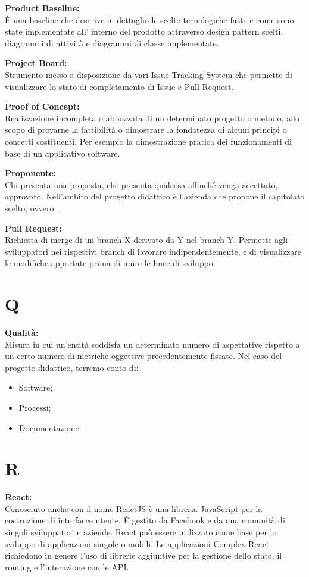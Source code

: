 \documentclass[a4paper, oneside, openany, dvipsnames, table]{article}
\begin{document}
\textbf{Product Baseline:}\\	\`E una baseline che descrive in dettaglio le scelte tecnologiche fatte e come sono state implementate all' interno del prodotto attraverso design pattern scelti, diagrammi di attività e diagrammi di classe implementate.

\textbf{Project Board:}\\	Strumento messo a disposizione da vari Issue Tracking System che permette di visualizzare lo stato di completamento di Issue e Pull Request.

\textbf{Proof of Concept:}\\	Realizzazione incompleta o abbozzata di un determinato progetto o metodo, allo scopo di provarne la fattibilità o dimostrare la fondatezza di alcuni principi o concetti costituenti. Per esempio la dimostrazione pratica dei funzionamenti di base di un applicativo software.

\textbf{Proponente:}\\	Chi presenta una proposta, che presenta qualcosa affinché venga accettato, approvato. Nell'ambito del progetto didattico è l'azienda che propone il capitolato scelto, ovvero \proponente.

\textbf{Pull Request:}\\	Richiesta di merge di un branch X derivato da Y nel branch Y. Permette agli sviluppatori nei rispettivi branch di lavorare indipendentemente, e di visualizzare le modifiche apportate prima di unire le linee di sviluppo.

\newpage
\section{Q}
\textbf{Qualità:}\\	Misura in cui un'entità soddisfa un determinato numero di aspettative rispetto a un certo numero di metriche oggettive precedentemente fissate. Nel caso del progetto didattico, terremo conto di:
\begin{itemize}
	\item Software;
	\item Processi;
	\item Documentazione.
\end{itemize}


\newpage
\section{R}
\textbf{React:}\\	Conosciuto anche con il nome ReactJS è una libreria JavaScript per la costruzione di interfacce utente. È gestito da Facebook e da una comunità di singoli sviluppatori e aziende. React può essere utilizzato come base per lo sviluppo di applicazioni singole o mobili. Le applicazioni Complex React richiedono in genere l'uso di librerie aggiuntive per la gestione dello stato, il routing e l'interazione con le API.
 
\end{document}
